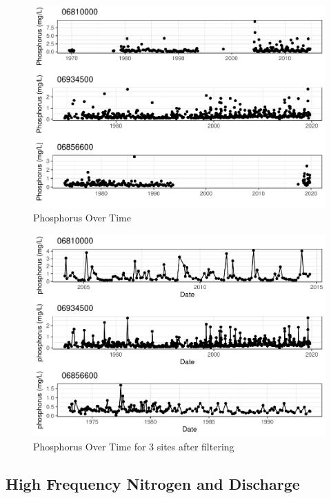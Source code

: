 \documentclass[12pt,]{article}
\begin{document}
\begin{figure}
\centering
\includegraphics{Project_Template_files/figure-latex/P.t-1.pdf}
\caption{\label{fig:P.t}Phosphorus Over Time}
\end{figure}

\begin{figure}
\centering
\includegraphics{Project_Template_files/figure-latex/P.t3-1.pdf}
\caption{\label{fig:P.t3}Phosphorus Over Time for 3 sites after
filtering}
\end{figure}

\newpage

\hypertarget{high-frequency-nitrogen-and-discharge}{%
\subsection{High Frequency Nitrogen and
Discharge}\label{high-frequency-nitrogen-and-discharge}}
\end{document}
